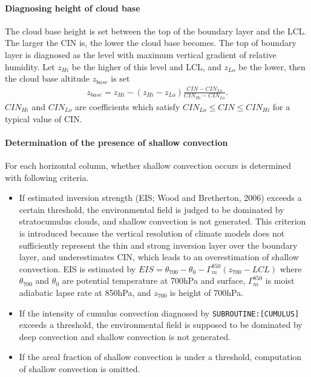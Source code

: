 \hypertarget{diagno-height-of-cloud-base}{%
\paragraph{Diagnosing height of cloud base}\label{diagno-height-of-cloud-base}}

The cloud base height is set between the top of the boundary layer and the LCL. The larger the CIN is, the lower the cloud base becomes. The top of boundary layer is diagnosed as the level with
maximum vertical gradient of relative humidity. Let \(z_{Hi}\) be the higher of this level and LCL, and \(z_{Lo}\) be the lower, then the cloud base altitude \(z_{base}\) is set \begin{eqnarray}\label{zbase}
    z_{base} = z_{Hi} - (z_{Hi}-z_{Lo})\frac{CIN-CIN_{Lo}}{CIN_{Hi} - CIN_{Lo}}.\end{eqnarray} \(CIN_{Hi}\) and \(CIN_{Lo}\) are coefficients which satisfy \(CIN_{Lo}\le CIN \le CIN_{Hi}\) for a typical value of
CIN.

\hypertarget{presence-of-shallow-convection}{%
\paragraph{Determination of the presence of shallow convection}\label{presence-of-shallow-convection}}

For each horizontal column, whether shallow convection occurs is determined with following criteria.

\begin{itemize}
\item
  If estimated inversion strength (EIS; Wood and Bretherton, 2006) exceeds a certain threshold, the environmental field is judged to be dominated by stratocumulus clouds, and shallow convection is not
  generated. This criterion is introduced because the vertical resolution of climate models does not sufficiently represent the thin and strong inversion layer over the boundary layer, and
  underestimates CIN, which leads to an overestimation of shallow convection. EIS is estimated by \(EIS=\theta_{700}-\theta_{0}-\Gamma_m^{850}(z_{700}-LCL)\) where \(\theta_{700}\) and \(\theta_0\)
  are potential temperature at 700hPa and surface, \(\Gamma_m^{850}\) is moist adiabatic lapse rate at 850hPa, and \(z_{700}\) is height of 700hPa.
\item
  If the intensity of cumulus convection diagnosed by \texttt{SUBROUTINE:{[}CUMULUS{]}} exceeds a threshold, the environmental field is supposed to be dominated by deep convection and shallow
  convection is not generated.
\item
  If the areal fraction of shallow convection is under a threshold, computation of shallow convection is omitted.
\end{itemize}

